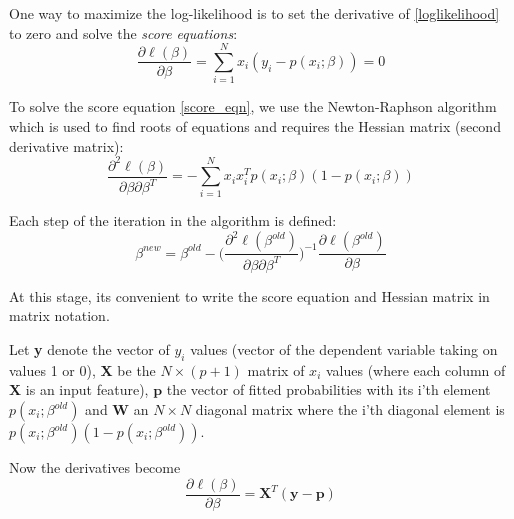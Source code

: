 \documentclass{article}
\numberwithin{equation}{subsection}
\begin{document}
One way to maximize the log-likelihood is to set the derivative of \eqref{loglikelihood} to zero and solve the \textit{score equations}:
\begin{equation}
\dfrac{\partial\ell(\beta)}{\partial \beta} = \sum^{N}_{i=1}x_{i}(y_{i}-p(x_{i};\beta)) = 0 \label{score_eqn}
\end{equation}

To solve the score equation \eqref{score_eqn}, we use the Newton-Raphson algorithm which is used
to find roots of equations and requires the Hessian matrix (second derivative matrix):
\begin{equation}
\dfrac{\partial^{2}\ell(\beta)}{\partial \beta \partial \beta^{T}} = -\sum^{N}_{i=1}x_{i}x^{T}_{i}p(x_{i};\beta)(1-p(x_{i};\beta))
\end{equation}

Each step of the iteration in the algorithm is defined:
\begin{equation}
  \beta^{new} = \beta^{old} - \bigg(\dfrac{\partial^{2}\ell(\beta^{old})}{\partial\beta\partial\beta^{T}}\bigg)^{-1} \dfrac{\partial \ell(\beta^{old})}{\partial\beta}
\end{equation}

At this stage, its convenient to write the score equation and Hessian matrix in matrix notation.

Let \textbf{y} denote the vector of $y_{i}$ values (vector of the dependent variable taking on
values 1 or 0), \textbf{X} be the $N \times (p+1)$ matrix of $x_{i}$ values (where each column 
of \textbf{X} is an input feature), $\textbf{p}$ the vector of fitted probabilities with its 
i'th element $p(x_{i};\beta^{old})$ and \textbf{W} an $N \times N$ diagonal matrix where the i'th
diagonal element is $p(x_{i}; \beta^{old})(1-p(x_{i};\beta^{old}))$. 

Now the derivatives become
\begin{equation}
  \dfrac{\partial\ell(\beta)}{\partial \beta} = \textbf{X}^{T}(\textbf{y} - \textbf{p})
\end{equation}
\end{document}
